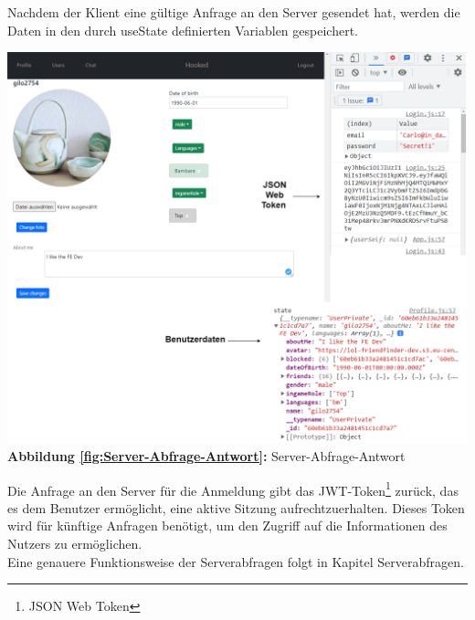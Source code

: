 Nachdem der Klient eine gültige Anfrage an den Server gesendet hat, werden die Daten in den durch useState definierten Variablen gespeichert.
\begin{center}
  \includegraphics[scale=0.4]
  {sources/Server-Abfrage-Antwort}\label{fig:Server-Abfrage-Antwort}\\
  \textbf{Abbildung \autoref{fig:Server-Abfrage-Antwort}:} Server-Abfrage-Antwort
\end{center}

Die Anfrage an den Server für die Anmeldung gibt das JWT-Token\footnote{JSON Web Token{\cite{JWT1}}} zurück, das es dem Benutzer ermöglicht, eine aktive Sitzung aufrechtzuerhalten. Dieses Token wird für künftige Anfragen benötigt, um den Zugriff auf die Informationen des Nutzers zu ermöglichen.
\\
Eine genauere Funktionsweise der Serverabfragen folgt in Kapitel Serverabfragen.
\\

\newpage

